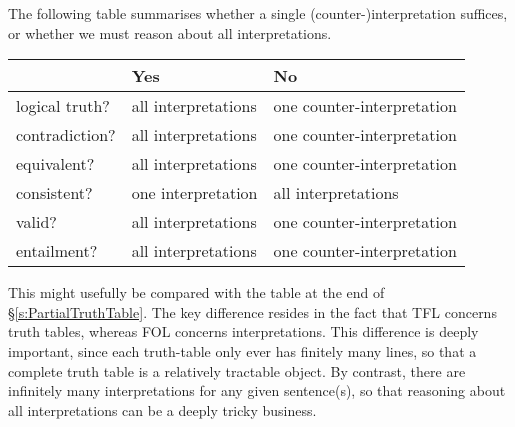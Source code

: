 The following table summarises whether a single (counter-)interpretation suffices, or whether we must reason about all interpretations.


\begin{center}
\begin{tabular}{l l l}
 & \textbf{Yes} & \textbf{No}\\
 \hline
logical truth? & all interpretations & one counter-interpretation\\
contradiction? &  all interpretations  & one counter-interpretation\\
equivalent? & all interpretations & one counter-interpretation\\
consistent? & one interpretation & all interpretations\\
valid? & all interpretations & one counter-interpretation\\
entailment? & all interpretations & one counter-interpretation\\
\end{tabular}
\end{center}
\label{table.ModelOrArgument}

This might usefully be compared with the table at the end of \S\ref{s:PartialTruthTable}. The key difference resides in the fact that TFL concerns truth tables, whereas FOL concerns interpretations. This difference is deeply important, since each truth-table only ever has finitely many lines, so that a complete truth table is a relatively tractable object. By contrast, there are infinitely many interpretations for any given sentence(s), so that reasoning about all interpretations can be a deeply tricky business. 
